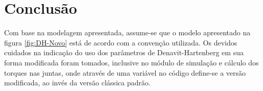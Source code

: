 \chapter{Conclusão}

Com base na modelagem apresentada, assume-se que o modelo apresentado na figura \ref{fig:DH-Novo}
está de acordo com a convenção utilizada. Os devidos cuidados na indicação do uso dos parâmetros de
Denavit-Hartenberg em sua forma modificada foram tomados, inclusive no módulo de simulação e cálculo
dos torques nas juntas, onde através de uma variável no código define-se a versão modificada, ao invés
da versão clássica padrão.
